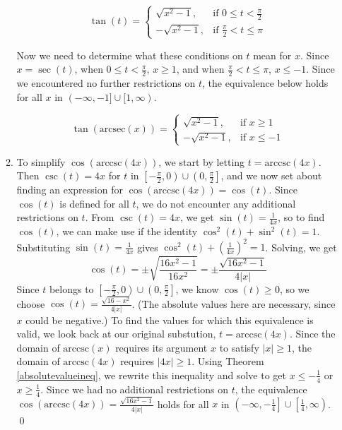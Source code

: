 \begin{ex}
\begin{enumerate}
\begin{enumerate}
\[ \tan(t) = \left\{ \begin{array}{rr} \sqrt{x^2-1}, & \text{if $0 \leq t < \frac{\pi}{2}$} \\ [5pt] -\sqrt{x^2-1}, & \text{if $\frac{\pi}{2} < t \leq \pi$}  \end{array}\right. \]

Now we need to determine what these conditions on $t$ mean for $x$.  Since $x = \sec(t)$, when $0 \leq t < \frac{\pi}{2}$, $x \geq 1$, and when $\frac{\pi}{2} < t \leq \pi$, $x \leq -1$.  Since we encountered no further restrictions on $t$, the  equivalence below holds for all $x$ in $(-\infty, -1] \cup [1, \infty)$.

\[ \tan(\mbox{arcsec}(x)) = \left\{ \begin{array}{rr} \sqrt{x^2-1}, & \text{if $x \geq 1$} \\[5pt]  -\sqrt{x^2-1}, & \text{if $x \leq -1$}  \end{array}\right. \]



\item  To simplify $\cos(\mbox{arccsc}(4x))$, we start by letting $t = \mbox{arccsc}(4x)$.   Then $\csc(t) = 4x$ for $t$ in $\left[-\frac{\pi}{2}, 0 \right) \cup \left(0, \frac{\pi}{2}\right]$, and we now set about finding an expression for  $\cos(\mbox{arccsc}(4x)) = \cos(t)$.  Since $\cos(t)$ is defined for all $t$, we do not encounter any additional restrictions on $t$.  From $\csc(t) = 4x$, we get $\sin(t) = \frac{1}{4x}$, so to find $\cos(t)$, we can make use if the identity $\cos^{2}(t) + \sin^{2}(t) = 1$.  Substituting $\sin(t) = \frac{1}{4x}$  gives $\cos^{2}(t) + \left(\frac{1}{4x}\right)^2 = 1$.  Solving, we get \[\cos(t) = \pm \sqrt{\frac{16x^2-1}{16x^2}} = \pm \frac{\sqrt{16x^2-1}}{4|x|}\]  Since $t$ belongs to $\left[-\frac{\pi}{2}, 0 \right) \cup \left(0, \frac{\pi}{2}\right]$, we know $\cos(t) \geq 0$, so we choose $\cos(t) = \frac{\sqrt{16-x^2}}{4|x|}$. (The absolute values here are necessary, since $x$ could be negative.)  To find the values for which this equivalence is valid, we look back at our original substution,  $t = \mbox{arccsc}(4x)$.  Since the domain of $\mbox{arccsc}(x)$ requires its argument $x$ to satisfy $|x| \geq 1$, the domain of $\mbox{arccsc}(4x)$ requires $|4x| \geq 1$.  Using Theorem \ref{absolutevalueineq}, we rewrite this inequality and solve to get $x \leq -\frac{1}{4}$ or $x \geq \frac{1}{4}$.  Since we had no additional restrictions on $t$, the equivalence  $\cos(\mbox{arccsc}(4x)) = \frac{\sqrt{16x^2-1}}{4|x|}$  holds for all $x$ in $\left(-\infty, -\frac{1}{4} \right] \cup \left[\frac{1}{4}, \infty \right)$.  \qed

\end{enumerate}

\end{enumerate}

\end{ex}

